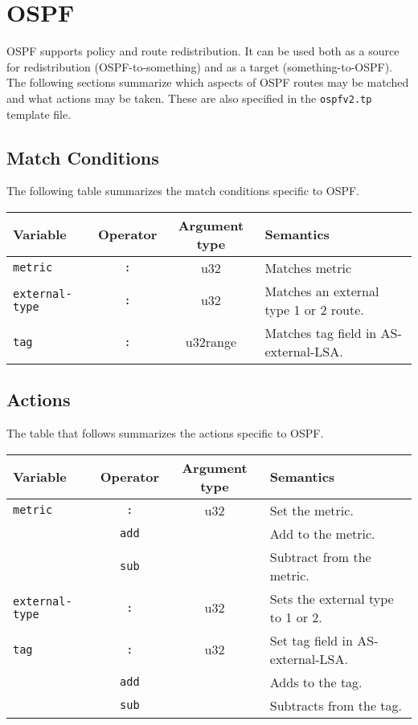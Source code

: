 \section{OSPF}
OSPF supports policy and route redistribution.  It can be used both as
a source for redistribution (OSPF-to-something) and as a target
(something-to-OSPF). The following sections summarize which aspects of
OSPF routes may be matched and what actions may be taken. These are
also specified in the {\tt ospfv2.tp} template file.

\subsection{Match Conditions}
The following table summarizes the match conditions specific to OSPF.

\begin{center}
\begin{tabular}{|l|c|c|p{7cm}|}
\hline
Variable & Operator & Argument type & Semantics \\
\hline\hline
{\tt metric} & {\tt :} & u32 & Matches metric \\
\hline

\hline
{\tt external-type} & {\tt :} & u32 & Matches an external type 1 or 2 route. \\
\hline

\hline
{\tt tag} & {\tt :} & u32range & Matches tag field in AS-external-LSA. \\
\hline
\end{tabular}
\end{center}

\subsection{Actions}
The table that follows summarizes the actions specific to OSPF.

\begin{center}
\begin{tabular}{|l|c|c|p{7cm}|}
\hline
Variable & Operator & Argument type & Semantics \\
\hline\hline
\hline
{\tt metric} & {\tt :} & u32 & Set the metric. \\
 & {\tt add} &  & Add to the metric. \\
 & {\tt sub} &  & Subtract from the metric. \\
\hline

\hline
{\tt external-type} & {\tt :} & u32 & Sets the external type to 1 or 2. \\
\hline

\hline
{\tt tag} & {\tt :} & u32 & Set tag field in AS-external-LSA. \\
& {\tt add} & & Adds to the tag. \\
& {\tt sub} & & Subtracts from the tag. \\
\hline
\end{tabular}
\end{center}

